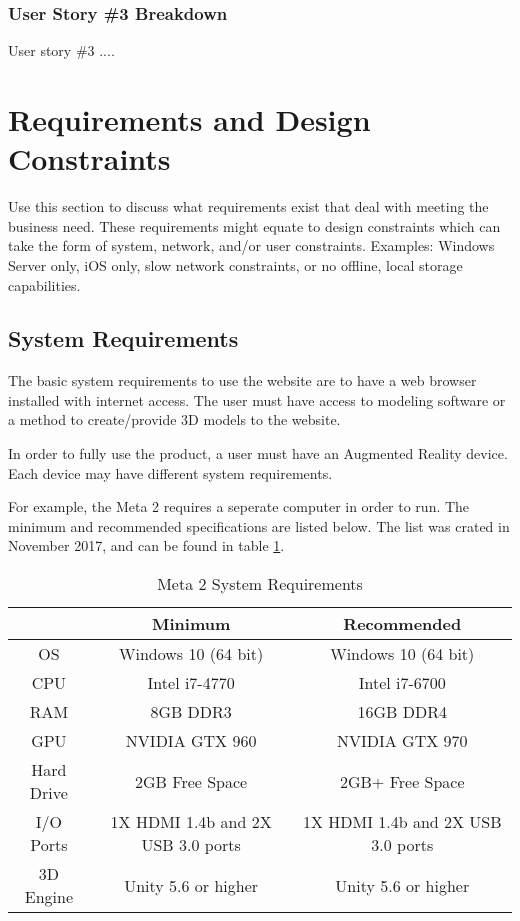 \subsubsection{User Story \#3 Breakdown}
User story \#3  .... 



\section{Requirements and Design Constraints}
Use this section to discuss what requirements exist that deal with meeting the 
business need.  These requirements might equate to design constraints which can 
take the form of system, network, and/or user constraints.  Examples:  Windows 
Server only, iOS only, slow network constraints, or no offline, local storage capabilities. 


\subsection{System  Requirements}

The basic system requirements to use the website are to have a web browser installed with internet access.  The user must have access to modeling software or a method to create/provide 3D models to the website.

In order to fully use the product, a user must have an Augmented Reality device.  Each device may have different system requirements.

For example, the Meta 2 requires a seperate computer in order to run.  The minimum and recommended specifications are listed below.  The list was crated in November 2017, and can be found in table \ref{table:metatwosystemrequirements}.


\begin{table}[H]
	\centering
	\begin{tabular}{ | c | c | c | }
		\hline
		& Minimum & Recommended \\ \hline
		OS & Windows 10 (64 bit) & 	Windows 10 (64 bit) \\ \hline
		CPU & Intel i7-4770 & Intel i7-6700 \\ \hline
		RAM & 8GB DDR3 & 16GB DDR4 \\ \hline
		GPU & NVIDIA GTX 960 & NVIDIA GTX 970 \\ \hline
		Hard Drive & 2GB Free Space & 2GB+ Free Space \\ \hline
		I/O Ports & 1X HDMI 1.4b and 2X USB 3.0 ports & 1X HDMI 1.4b and 2X USB 3.0 ports \\ \hline
		3D Engine & Unity 5.6 or higher & Unity 5.6 or higher \\ \hline
	\end{tabular}
	
	\caption{Meta 2 System Requirements}
	\label{table:metatwosystemrequirements}
\end{table}


